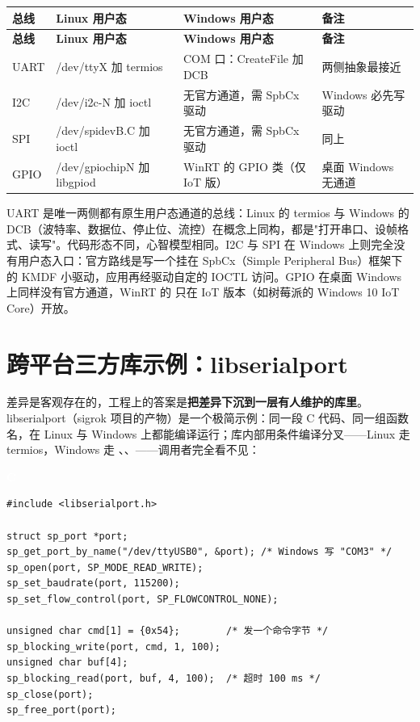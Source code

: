 \documentclass[12pt,a4paper,fontset=fandol]{ctexbook}
\newcommand{\clabel}{%
  \begin{tcolorbox}[enhanced,colback=cheadbg,colframe=cheadbg,
    arc=1mm,boxrule=0mm,left=6pt,right=6pt,top=2pt,bottom=2pt,
    halign=left,oversize]
    \textcolor{white}{\small\bfseries C}
  \end{tcolorbox}\vspace{-4pt}}
\begin{document}
\begin{longtable}{>{\raggedright\arraybackslash}p{2.0cm}>{\raggedright\arraybackslash}p{4.6cm}>{\raggedright\arraybackslash}p{4.6cm}>{\raggedright\arraybackslash}p{3.1cm}}
\toprule
\textbf{总线} & \textbf{Linux 用户态} & \textbf{Windows 用户态} & \textbf{备注} \\
\midrule
\endfirsthead
\toprule
\textbf{总线} & \textbf{Linux 用户态} & \textbf{Windows 用户态} & \textbf{备注} \\
\midrule
\endhead
UART & /dev/ttyX 加 termios & COM 口：CreateFile 加 DCB & 两侧抽象最接近 \\
I2C & /dev/i2c-N 加 ioctl & 无官方通道，需 SpbCx 驱动 & Windows 必先写驱动 \\
SPI & /dev/spidevB.C 加 ioctl & 无官方通道，需 SpbCx 驱动 & 同上 \\
GPIO & /dev/\allowbreak{}\allowbreak{}gpiochipN 加 libgpiod & WinRT 的 GPIO 类（仅 IoT 版） & 桌面 Windows 无通道 \\
\bottomrule
\end{longtable}

UART 是唯一两侧都有原生用户态通道的总线：Linux 的 termios 与 Windows 的 DCB（波特率、数据位、停止位、流控）在概念上同构，都是"打开串口、设帧格式、读写"。代码形态不同，心智模型相同。I2C 与 SPI 在 Windows 上则完全没有用户态入口：官方路线是写一个挂在 SpbCx（Simple Peripheral Bus）框架下的 KMDF 小驱动，应用再经驱动自定的 IOCTL 访问。GPIO 在桌面 Windows 上同样没有官方通道，WinRT 的  只在 IoT 版本（如树莓派的 Windows 10 IoT Core）开放。

\section{跨平台三方库示例：libserialport}\label{sec:libserialport}

差异是客观存在的，工程上的答案是\textbf{把差异下沉到一层有人维护的库里}。libserialport（sigrok 项目的产物）是一个极简示例：同一段 C 代码、同一组函数名，在 Linux 与 Windows 上都能编译运行；库内部用条件编译分叉——Linux 走 termios，Windows 走 、、——调用者完全看不见：

\clabel
\begin{lstlisting}[style=cstyle]
#include <libserialport.h>

struct sp_port *port;
sp_get_port_by_name("/dev/ttyUSB0", &port); /* Windows 写 "COM3" */
sp_open(port, SP_MODE_READ_WRITE);
sp_set_baudrate(port, 115200);
sp_set_flow_control(port, SP_FLOWCONTROL_NONE);

unsigned char cmd[1] = {0x54};        /* 发一个命令字节 */
sp_blocking_write(port, cmd, 1, 100);
unsigned char buf[4];
sp_blocking_read(port, buf, 4, 100);  /* 超时 100 ms */
sp_close(port);
sp_free_port(port);
\end{lstlisting}
\end{document}

